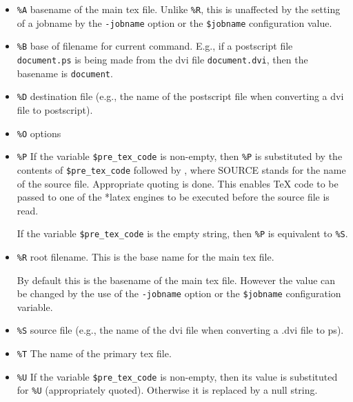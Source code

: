 \begin{itemize}

\item \verb|%A| basename of the main tex file.  Unlike \verb|%R|, this is
        unaffected by the setting of a jobname by  the \verb|-jobname| option or the
        \verb|$jobname| configuration value.

\item \verb|%B| base of filename for current command. E.g.,  if  a  postscript
file  \verb|document.ps|  is being made from the dvi file \verb|document.dvi|,
then the basename is \verb|document|.

\item \verb|%D| destination file (e.g., the name of  the  postscript  file  when
converting a dvi file to postscript).

\item \verb|%O| options

\item \verb|%P| If  the  variable \verb|$pre_tex_code| is non-empty, then
        \verb|%P| is substituted  by  the  contents  of  \verb|$pre_tex_code|
        followed  by   \verb||,  where  SOURCE  stands  for  the
        name of the source file.  Appropriate quoting is done.  This enables
        TeX code to be passed  to  one  of the *latex engines to be executed
        before the source file is read.

If the variable \verb|$pre_tex_code| is the empty string,  then  \verb|%P|  is
equivalent to \verb|%S|.

\item \verb|%R| root filename.  This is the base name for the main tex
        file.

By  default  this is the basename of the main tex file.  However the value can
be changed by the use of the  \verb|-jobname|  option  or the \verb|$jobname|
configuration variable.

\item \verb|%S|     source  file  (e.g.,  the name of the dvi file when converting a
.dvi file to ps).

\item \verb|%T|     The name of the primary tex file.

\item \verb|%U|     If the variable \verb|$pre_tex_code| is non-empty, then
        its  value  is substituted  for \verb|%U| (appropriately quoted).
        Otherwise it is replaced by a null string.


\end{itemize}
